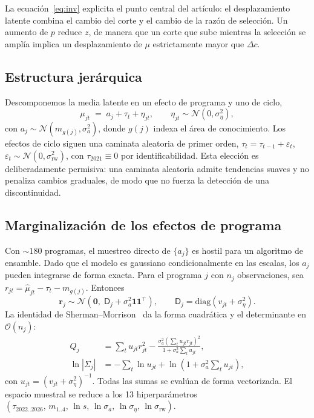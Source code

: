 \documentclass[aps,prd,reprint,amsmath,amssymb,nofootinbib,superscriptaddress]{revtex4-2}
\begin{document}
La ecuaci\'on~\eqref{eq:inv} explicita el punto central del art\'iculo:
el desplazamiento latente combina el cambio del corte y el cambio de la
raz\'on de selecci\'on. Un aumento de $p$ reduce $z$, de manera que un
corte que sube mientras la selecci\'on se ampl\'ia implica un
desplazamiento de $\mu$ estrictamente mayor que $\Delta c$.

\subsection{Estructura jer\'arquica}

Descomponemos la media latente en un efecto de programa y uno de ciclo,
\begin{equation}
\mu_{jt} \;=\; a_j + \tau_t + \eta_{jt},
\qquad \eta_{jt}\sim\mathcal{N}(0,\sigma_\eta^{2}),
\end{equation}
con $a_j\sim\mathcal{N}(m_{g(j)},\sigma_a^{2})$, donde $g(j)$ indexa el
\'area de conocimiento. Los efectos de ciclo siguen una caminata
aleatoria de primer orden,
$\tau_t=\tau_{t-1}+\varepsilon_t$, $\varepsilon_t\sim\mathcal{N}(0,\sigma_{\mathrm{rw}}^{2})$,
con $\tau_{2021}\equiv 0$ por identificabilidad. Esta elecci\'on es
deliberadamente permisiva: una caminata aleatoria admite tendencias
suaves y no penaliza cambios graduales, de modo que no fuerza la
detecci\'on de una discontinuidad.

\subsection{Marginalizaci\'on de los efectos de programa}

Con ${\sim}180$ programas, el muestreo directo de $\{a_j\}$ es hostil para
un algoritmo de ensamble. Dado que el modelo es gaussiano condicionalmente
en las escalas, los $a_j$ pueden integrarse de forma exacta. Para el
programa $j$ con $n_j$ observaciones, sea
$r_{jt}=\widehat{\mu}_{jt}-\tau_t-m_{g(j)}$. Entonces
\begin{equation}
\mathbf{r}_j\sim\mathcal{N}\!\left(\mathbf{0},\;
\mathsf{D}_j+\sigma_a^{2}\mathbf{1}\mathbf{1}^{\!\top}\right),
\qquad \mathsf{D}_j=\mathrm{diag}\!\left(v_{jt}+\sigma_\eta^{2}\right).
\end{equation}
La identidad de Sherman--Morrison~\cite{hager1989} da la forma
cuadr\'atica y el determinante en $\mathcal{O}(n_j)$:
\begin{align}
Q_j &= \textstyle\sum_t u_{jt}r_{jt}^{2}
 - \frac{\sigma_a^{2}\left(\sum_t u_{jt}r_{jt}\right)^{2}}{1+\sigma_a^{2}\sum_t u_{jt}},\\
\ln\!\left|\mathsf{\Sigma}_j\right| &= -\textstyle\sum_t \ln u_{jt}
 + \ln\!\left(1+\sigma_a^{2}\textstyle\sum_t u_{jt}\right),
\end{align}
con $u_{jt}=(v_{jt}+\sigma_\eta^{2})^{-1}$. Todas las sumas se eval\'uan
de forma vectorizada. El espacio muestral se reduce a los 13
hiperpar\'ametros
$\left(\tau_{2022..2026},\,m_{1..4},\,\ln s,\,\ln\sigma_a,\,\ln\sigma_\eta,\,\ln\sigma_{\mathrm{rw}}\right)$.
\end{document}
